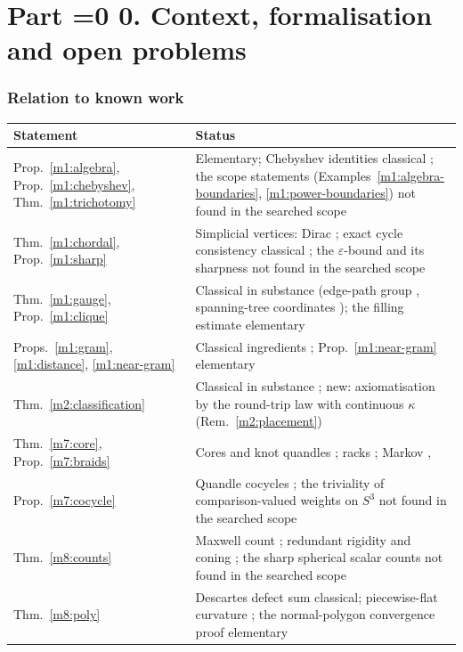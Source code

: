\documentclass[11pt,reqno]{amsart}
\theoremstyle{definition}
\theoremstyle{remark}
\numberwithin{equation}{section}
\newcounter{ppart}
\renewcommand{\theppart}{\ifnum\value{ppart}=0 0\else\Roman{ppart}\fi}
\newcommand{\paperpart}[2]{\refstepcounter{ppart}\part*{Part \theppart. #2}\label{#1}}
\begin{document}
\paperpart{part:final}{Context, formalisation and open problems}

\section{Relation to known work}\label{sec:known}

\begin{center}
\small
\begin{tabular}{@{}p{}p{}@{}}
\toprule
Statement & Status\\
\midrule
Prop.~\ref{m1:algebra}, Prop.~\ref{m1:chebyshev}, Thm.~\ref{m1:trichotomy} & Elementary; Chebyshev identities classical \cite{m1:DLMF}; the scope statements (Examples~\ref{m1:algebra-boundaries}, \ref{m1:power-boundaries}) not found in the searched scope\\
Thm.~\ref{m1:chordal}, Prop.~\ref{m1:sharp} & Simplicial vertices: Dirac \cite{m1:Dirac}; exact cycle consistency classical \cite{m1:Zaslavsky,m1:LermanShi,m1:Singer}; the $\varepsilon$-bound and its sharpness not found in the searched scope\\
Thm.~\ref{m1:gauge}, Prop.~\ref{m1:clique} & Classical in substance (edge-path group \cite{m1:Spanier}, spanning-tree coordinates \cite{Levy10}); the filling estimate elementary\\
Props.~\ref{m1:gram}, \ref{m1:distance}, \ref{m1:near-gram} & Classical ingredients \cite{m1:Schoenberg,m1:JordanVonNeumann,m1:Grone}; Prop.~\ref{m1:near-gram} elementary\\
Thm.~\ref{m2:classification} & Classical in substance \cite{Loos,Helgason,Wang52,Cartan26,Besse78}; new: axiomatisation by the round-trip law with continuous $\kappa$ (Rem.~\ref{m2:placement})\\
Thm.~\ref{m7:core}, Prop.~\ref{m7:braids} & Cores and knot quandles \cite{m7:Joyce,m7:Matveev}; racks \cite{m7:FennRourke}; Markov \cite{m7:Markov}, \cite[Thm.~2.3]{m7:Birman}\\
Prop.~\ref{m7:cocycle} & Quandle cocycles \cite{m7:CJKLS}; the triviality of comparison-valued weights on $S^3$ not found in the searched scope\\
Thm.~\ref{m8:counts} & Maxwell count \cite{m8:maxwell}; redundant rigidity and coning \cite{m8:hendrickson,m8:coning}; the sharp spherical scalar counts not found in the searched scope\\
Thm.~\ref{m8:poly} & Descartes defect sum classical; piecewise-flat curvature \cite{m8:cheeger}; the normal-polygon convergence proof elementary\\

\end{tabular}
\end{center}
\end{document}
